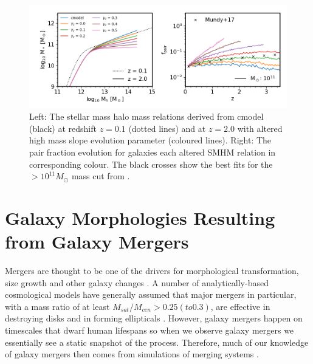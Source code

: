 \begin{figure}
	\centering
	\includegraphics[width = \linewidth]{Figures/Chapter5/PairFractionHMevo.png}
    \caption{Left: The stellar mass halo mass relations derived from cmodel (black) at redshift $z = 0.1$ (dotted lines) and at $z = 2.0$ with altered high mass slope evolution parameter (coloured lines). Right: The pair fraction evolution for galaxies each altered SMHM relation in corresponding colour. The black crosses show the best fits for the $>10^{11}M_{\odot}$ mass cut from \citet{Mundy2017A3.5}.}
	\label{fig:PairFractionHMevo}
\end{figure}

\section{Galaxy Morphologies Resulting from Galaxy Mergers}

Mergers are thought to be one of the drivers for morphological transformation, size growth and other galaxy changes \citep{Bournaud2007, Hopkins2009TheDemographics, Hopkins2010MergersFunctions, Shankar2011SizeUniverse, Fontanot2015OnMergers}. A number of analytically-based cosmological models have generally assumed that major mergers in particular, with a mass ratio of at least $M_{sat}/M_{cen} > 0.25(to 0.3)$, are effective in destroying disks and in forming ellipticals \citep{Baugh2006AApproach, Malbon2007BlackFormation, Bower2010TheFormation}. However, galaxy mergers happen on timescales that dwarf human lifespans so when we observe galaxy mergers we essentially see a static snapshot of the process. Therefore, much of our knowledge of galaxy mergers then comes from simulations of merging systems \cite[e..g.][]{Hopkins2006ASpheroids,Hopkins2009TheDemographics, Hopkins2010MergersRate,Hopkins2009HOWMERGERS,Hopkins2010MERGERSMATTER,OLeary2020EMERGE:zsim6,Fensch2017High-redshiftFormation,Stewart2008MergerSurvival,Stewart2009GALAXYDEPENDENCE}. 

